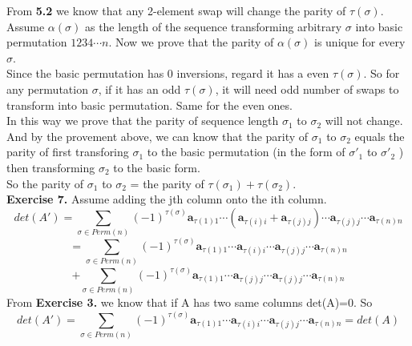 \documentclass{article}
\begin{document}
From \textbf{5.2} we know that any 2-element swap will change the parity of $\tau(\sigma)$. Assume $\alpha(\sigma)$ as the length of the sequence transforming arbitrary $\sigma$ into basic permutation $1234\cdots n$.
 Now we prove that the parity of $\alpha(\sigma)$ is unique for every $\sigma$.\\

Since the basic permutation has 0 inversions, regard it has a even $\tau(\sigma)$. So for any permutation $\sigma$, if it has an odd $\tau(\sigma)$, it will need odd number of swaps to transform into basic permutation. Same for the even ones.\\

In this way we prove that the parity of sequence length $\sigma_1$ to $\sigma_2$ will not change.
 And by the provement above, we can know that the parity of $\sigma_1$ to $\sigma_2$ equals the parity of first transforing $\sigma_1$ to the basic permutation (in the form of $\sigma'_1$ to $\sigma'_2$ ) 
 then transforming $\sigma_2$ to the basic form.\\
 So the parity of $\sigma_1$ to $\sigma_2$  = the parity of $\tau(\sigma_1)+\tau(\sigma_2)$.\\

\textbf{Exercise 7.}
    Assume adding the jth column onto the ith column.
    \[
    det(A')=\sum_{\sigma \in Perm(n)}^{} (-1)^{\tau(\sigma)} \mathbf{a}_{\tau(1)1}\cdots(\mathbf{a}_{\tau(i)i}+\mathbf{a}_{\tau(j)j}) \cdots \mathbf{a}_{\tau(j)j} \cdots \mathbf{a}_{\tau(n)n}
    \]
    \[
    =\sum_{\sigma \in Perm(n)}^{} (-1)^{\tau(\sigma)} \mathbf{a}_{\tau(1)1}\cdots\mathbf{a}_{\tau(i)i}\cdots \mathbf{a}_{\tau(j)j} \cdots \mathbf{a}_{\tau(n)n}
    \]
    \[
    +\sum_{\sigma \in Perm(n)}^{} (-1)^{\tau(\sigma)} \mathbf{a}_{\tau(1)1}\cdots\mathbf{a}_{\tau(j)j} \cdots \mathbf{a}_{\tau(j)j} \cdots \mathbf{a}_{\tau(n)n}
    \]
    From \textbf{Exercise 3.} we know that if A has two same columns det(A)=0. So \[
    det(A')=\sum_{\sigma \in Perm(n)}^{} (-1)^{\tau(\sigma)} \mathbf{a}_{\tau(1)1}\cdots\mathbf{a}_{\tau(i)i}\cdots \mathbf{a}_{\tau(j)j} \cdots \mathbf{a}_{\tau(n)n} = det(A)
    \]
\end{document}

